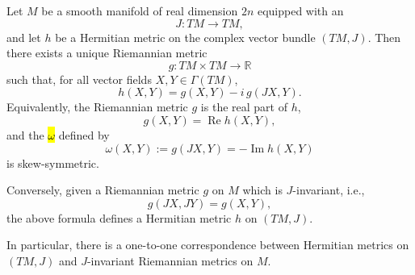 \begin{lemma} \label{lemma:hermitian_and_riemannian_metrics_correspond_on_smooth_manifolds_with_almost_complex_structure}
    Let $M$ be a smooth manifold of real dimension $2n$ equipped with an 
    $$J : TM \to TM,$$
    and let $h$ be a Hermitian metric on the complex vector bundle $(TM, J)$. Then there exists a unique Riemannian metric
    $$g : TM \times TM \to \mathbb{R}$$
    such that, for all vector fields $X, Y \in \Gamma(TM)$,
    $$h(X, Y) = g(X, Y) - i\, g(JX, Y).$$
    Equivalently, the Riemannian metric $g$ is the real part of $h$,
    $$g(X, Y) = \operatorname{Re} h(X, Y),$$
    and the  \hl{$\omega$} defined by
    $$\omega(X, Y) := g(JX, Y) = - \operatorname{Im} h(X, Y)$$
    is skew-symmetric.
    
    Conversely, given a Riemannian metric $g$ on $M$ which is $J$-invariant, i.e.,
    $$g(JX, JY) = g(X, Y),$$
    the above formula defines a Hermitian metric $h$ on $(TM, J)$.

    In particular, there is a one-to-one correspondence between Hermitian metrics on $(TM, J)$ and $J$-invariant Riemannian metrics on $M$.
\end{lemma}